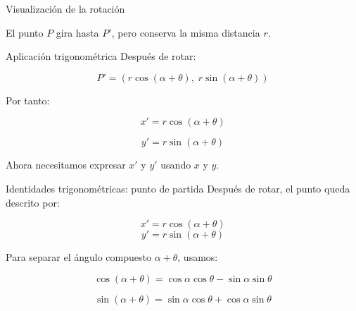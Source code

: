 \documentclass{beamer}
\begin{document}
\begin{frame}{Visualización de la rotación}
\begin{center}
\end{center}

El punto \(P\) gira hasta \(P'\), pero conserva la misma distancia \(r\).
\end{frame}

\begin{frame}{Aplicación trigonométrica}
Después de rotar:

\[
P'=(r\cos(\alpha+\theta),\; r\sin(\alpha+\theta))
\]

Por tanto:

\[
x' = r\cos(\alpha+\theta)
\]

\[
y' = r\sin(\alpha+\theta)
\]

\medskip

Ahora necesitamos expresar \(x'\) y \(y'\) usando \(x\) y \(y\).
\end{frame}

\begin{frame}{Identidades trigonométricas: punto de partida}
Después de rotar, el punto queda descrito por:

\[
x'=r\cos(\alpha+\theta)
\]
\[
y'=r\sin(\alpha+\theta)
\]

Para separar el ángulo compuesto \(\alpha+\theta\), usamos:

\[
\cos(\alpha+\theta)=
\cos\alpha\cos\theta-\sin\alpha\sin\theta
\]

\[
\sin(\alpha+\theta)=
\sin\alpha\cos\theta+\cos\alpha\sin\theta
\]
\end{frame}
\end{document}

